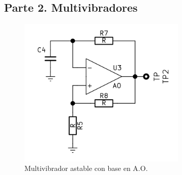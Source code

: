     
    \subsection{Parte 2. Multivibradores}\label{subsec:meto_parte2}

        \begin{figure}[H]
            \centering
            \setcounter{figure}{12}
            \includegraphics[width=8cm]{Circuitos/astable.png}
            \caption{Multivibrador astable con base en A.O.}
            \label{fig:astable}
        \end{figure}
        
     
        
